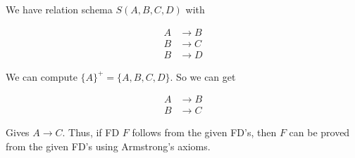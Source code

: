 We have relation schema $S(A,B,C,D)$ with

\begin{align*}
  A &\to B \\
  B &\to C \\
  B &\to D
\end{align*}

We can compute $\{A\}^+ = \{A,B,C,D\}$. So we can get

\begin{align*}
  A &\to B \\
  B &\to C
\end{align*}

Gives $A \to C$. Thus, if FD $F$ follows from the given FD's,
then $F$ can be proved from the given FD's using Armstrong's
axioms.
